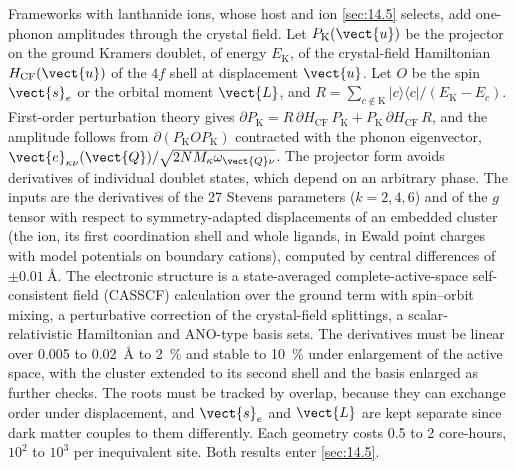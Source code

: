 Frameworks with lanthanide ions, whose host and ion \cref{sec:14.5} selects, add one-phonon amplitudes through the crystal field. Let $P_{\mathrm{K}}(\vect{u})$ be the projector on the ground Kramers doublet, of energy $E_{\mathrm{K}}$, of the crystal-field Hamiltonian $H_{\mathrm{CF}}(\vect{u})$ of the $4f$ shell at displacement $\vect{u}$. Let $O$ be the spin $\vect{s}_e$ or the orbital moment $\vect{L}$, and $R = \sum_{c\notin\mathrm{K}}|c\rangle\langle c|/(E_{\mathrm{K}} - E_c)$. First-order perturbation theory gives $\partial P_{\mathrm{K}} = R\,\partial H_{\mathrm{CF}}\,P_{\mathrm{K}} + P_{\mathrm{K}}\,\partial H_{\mathrm{CF}}\,R$, and the amplitude follows from $\partial(P_{\mathrm{K}}OP_{\mathrm{K}})$ contracted with the phonon eigenvector, $\vect{e}_{\kappa\nu}(\vect{Q})/\sqrt{2NM_\kappa\omega_{\vect{Q}\nu}}$. The projector form avoids derivatives of individual doublet states, which depend on an arbitrary phase. The inputs are the derivatives of the 27 Stevens parameters ($k = 2,4,6$) and of the $g$ tensor with respect to symmetry-adapted displacements of an embedded cluster (the ion, its first coordination shell and whole ligands, in Ewald point charges with model potentials on boundary cations), computed by central differences of $\pm\SI{0.01}{\angstrom}$. The electronic structure is a state-averaged complete-active-space self-consistent field (CASSCF) calculation over the ground term with spin--orbit mixing, a perturbative correction of the crystal-field splittings, a scalar-relativistic Hamiltonian and ANO-type basis sets. The derivatives must be linear over 0.005 to \SI{0.02}{\angstrom} to \SI{2}{\percent} and stable to \SI{10}{\percent} under enlargement of the active space, with the cluster extended to its second shell and the basis enlarged as further checks. The roots must be tracked by overlap, because they can exchange order under displacement, and $\vect{s}_e$ and $\vect{L}$ are kept separate since dark matter couples to them differently. Each geometry costs 0.5 to 2 core-hours, $10^2$ to $10^3$ per inequivalent site. Both results enter \cref{sec:14.5}.
